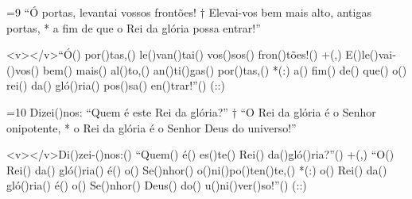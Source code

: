 =9 “Ó portas, levantai vossos frontões! †
Elevai-vos bem mais alto, antigas portas, *
a fim de que o Rei da glória possa entrar!”

<v></v>``Ó() por()tas,() le()van()tai() vos()sos() fron()tões!() +(,)
E()le()vai-()vos() bem() mais() al()to,() an()ti()gas() por()tas,() *(:)
a() fim() de() que() o() rei() da() gló()ria() pos()sa() en()trar!''() (::)

=10 Dizei()nos: “Quem é este Rei da glória?” †
“O Rei da glória é o Senhor onipotente, *
o Rei da glória é o Senhor Deus do universo!”

<v></v>Di()zei-()nos:() ``Quem() é() es()te() Rei() da()gló()ria?''() +(,)
``O() Rei() da() gló()ria() é() o() Se()nhor() o()ni()po()ten()te,() *(:)
o() Rei() da() gló()ria() é() o() Se()nhor() Deus() do() u()ni()ver()so!''() (::)